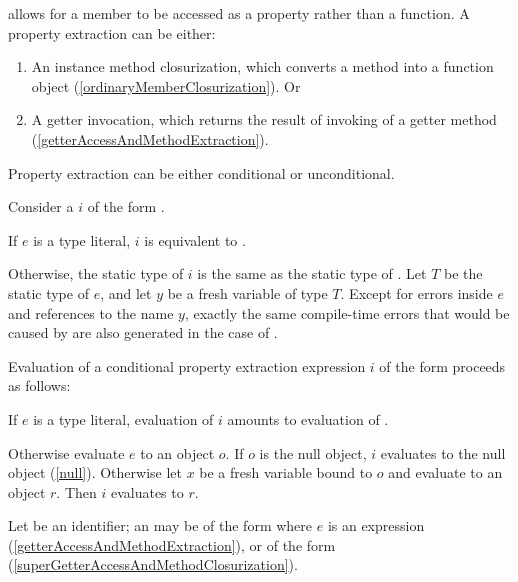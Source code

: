 \documentclass[makeidx]{article}
\begin{document}
{\LMHash{}%
allows for a member to be accessed as a property rather than a function.
A property extraction can be either:
\begin{enumerate}
\item An instance method closurization,
  which converts a method into a function object
  (\ref{ordinaryMemberClosurization}).
  Or
\item A getter invocation, which returns
  the result of invoking of a getter method
  (\ref{getterAccessAndMethodExtraction}).
\end{enumerate}


Property extraction can be either conditional or unconditional.

\LMHash{}%
Consider a 
$i$ of the form .

\LMHash{}%
If $e$ is a type literal, $i$ is equivalent to .

\LMHash{}%
Otherwise, the static type of $i$ is the same as
the static type of .
Let $T$ be the static type of $e$,
and let $y$ be a fresh variable of type $T$.
Except for errors inside $e$ and references to the name $y$,
exactly the same compile-time errors that would be caused by 
are also generated in the case of .

\LMHash{}%
Evaluation of a conditional property extraction expression $i$
of the form  proceeds as follows:

\LMHash{}%
If $e$ is a type literal,
evaluation of $i$ amounts to evaluation of .

\LMHash{}%
Otherwise evaluate $e$ to an object $o$.
If $o$ is the null object, $i$ evaluates to the null object (\ref{null}).
Otherwise let $x$ be a fresh variable bound to $o$
and evaluate  to an object $r$.
Then $i$ evaluates to $r$.
\EndCase

\LMHash{}%
Let \id{} be an identifier;
an 
may be of the form  where $e$ is an expression
(\ref{getterAccessAndMethodExtraction}),
or of the form 
(\ref{superGetterAccessAndMethodClosurization}).
\EndCase


}
\end{document}
